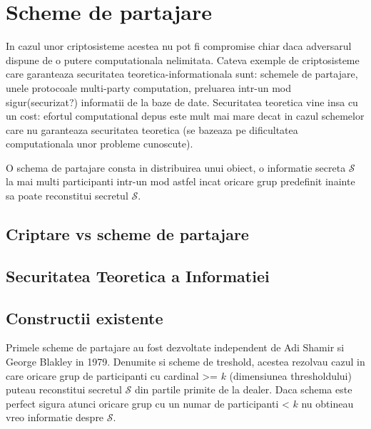 \documentclass{llncs}
\begin{document}
\section{Scheme de partajare}
\label{sec:encryption}


In cazul unor criptosisteme acestea nu pot fi compromise chiar daca adversarul dispune de o putere computationala nelimitata. Cateva exemple de criptosisteme care garanteaza securitatea teoretica-informationala sunt: schemele de partajare, unele protocoale multi-party computation, preluarea intr-un mod sigur(securizat?) informatii de la baze de date. Securitatea teoretica vine insa cu un cost: efortul computational depus este mult mai mare decat in cazul schemelor care nu garanteaza securitatea teoretica (se bazeaza pe dificultatea computationala unor probleme cunoscute). \cite{L:1997}

O schema de partajare consta in distribuirea unui obiect, o informatie secreta $\mathcal{S}$ la mai multi participanti intr-un mod astfel incat oricare grup predefinit inainte sa poate reconstitui secretul $\mathcal{S}$.


\subsection{Criptare vs scheme de partajare}


\subsection{Securitatea Teoretica a Informatiei}
\label{sec:crypt_vs_sharing}

\subsection{Constructii existente}
Primele scheme de partajare au fost dezvoltate independent de Adi Shamir si George Blakley in 1979. \cite{B:1979, S:1979}
Denumite si scheme de treshold, acestea rezolvau cazul in care oricare grup de participanti cu cardinal  >= $k$  (dimensiunea thresholdului) puteau reconstitui secretul $\mathcal{S}$ din partile primite de la dealer. Daca schema este perfect sigura atunci oricare grup cu un numar de participanti < $k$ nu obtineau vreo informatie despre $\mathcal{S}$.
\end{document}

